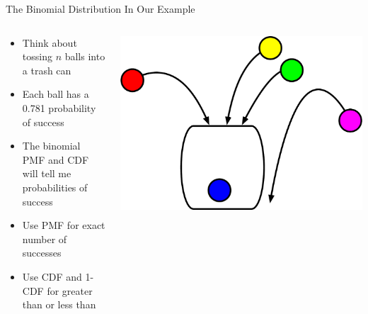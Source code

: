 \documentclass[aspectratio=169]{beamer}
\begin{document}
\begin{frame}{The Binomial Distribution In Our Example}

\begin{columns}[c]
\begin{column}{0.6\textwidth}
\begin{itemize}
\item Think about tossing $n$ balls into a trash can
\item Each ball has a 0.781 probability of success
\item The binomial PMF and CDF will tell me probabilities of success
\item Use PMF for exact number of successes
\item Use CDF and 1-CDF for greater than or less than
\end{itemize}
\end{column}
\begin{column}{0.4\textwidth}
\includegraphics[width=1\textwidth]{lectModel1/ballsInTrash.pdf}
\end{column}
\end{columns}
\end{frame}
\end{document}
